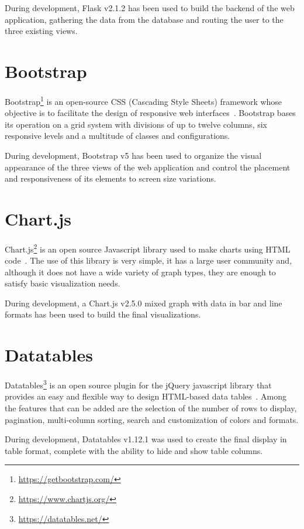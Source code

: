 \nonzeroparskip During development, Flask v2.1.2 has been used to build the backend of the web application, gathering the data from the database and routing the user to the three existing views.

\section{Bootstrap}

\nonzeroparskip Bootstrap\footnote{\url{https://getbootstrap.com/}} is an open-source CSS (Cascading Style Sheets) framework whose objective is to facilitate the design of responsive web interfaces~\cite{bootstrap}. Bootstrap bases its operation on a grid system with divisions of up to twelve columns, six responsive levels and a multitude of classes and configurations.

\nonzeroparskip During development, Bootstrap v5 has been used to organize the visual appearance of the three views of the web application and control the placement and responsiveness of its elements to screen size variations.

\section{Chart.js}

\nonzeroparskip Chart.js\footnote{\url{https://www.chartjs.org/}} is an open source Javascript library used to make charts using HTML code~\cite{w3schools_chartjs}. The use of this library is very simple, it has a large user community and, although it does not have a wide variety of graph types, they are enough to satisfy basic visualization needs.

\nonzeroparskip During development, a Chart.js v2.5.0 mixed graph with data in bar and line formats has been used to build the final visualizations.

\section{Datatables}

\nonzeroparskip Datatables\footnote{\url{https://datatables.net/}} is an open source plugin for the jQuery javascript library that provides an easy and flexible way to design HTML-based data tables~\cite{datatables}. Among the features that can be added are the selection of the number of rows to display, pagination, multi-column sorting, search and customization of colors and formats.

\nonzeroparskip During development, Datatables v1.12.1 was used to create the final display in table format, complete with the ability to hide and show table columns.

